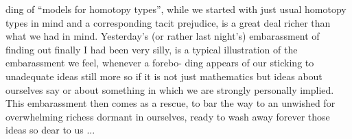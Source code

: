 ding of ``models for homotopy types'', while we started with just usual
homotopy types in mind and a corresponding tacit prejudice, is a great
deal richer than what we had in mind. Yesterday's (or rather last
night's) embarassment of finding out finally I had been very silly, is
a typical illustration of the embarassment we feel, whenever a forebo-%
ding appears of our sticking to unadequate ideas\over{,}{;} still more so if it is
not just mathematics but ideas about ourselves say or about something
in which we are strongly personally implied. This embarassment then
comes as a rescue, to bar the way to an unwished for overwhelming
richess dormant in ourselves,  ready to wash away forever those ideas
so dear to us ...

